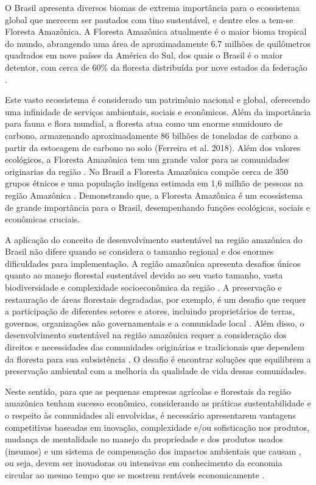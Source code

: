 O Brasil apresenta diversos biomas de extrema importância para o ecossistema global que merecem ser pautados com tino sustentável, e dentre eles a tem-se Floresta Amazônica. A Floresta Amazônica atualmente é o maior bioma tropical do mundo, abrangendo uma área de aproximadamente 6.7 milhões de quilômetros quadrados em nove países da América do Sul, dos quais o Brasil é o maior detentor, com cerca de 60\% da floresta distribuída por nove estados da federação \cite{Malhi2008ClimateAmazon}. 

Este vasto ecossistema é considerado um patrimônio nacional e global, oferecendo uma infinidade de serviços ambientais, sociais e econômicos. Além da importância para fauna e flora mundial, a floresta atua como um enorme sumidouro de carbono, armazenando aproximadamente 86 bilhões de toneladas de carbono a partir da estocagem de carbono no solo (Ferreira et al. 2018). Além dos valores ecológicos, a Floresta Amazônica tem um grande valor para as comunidades originarias da região \cite{Walker2002LandCycles}. No Brasil a Floresta Amazônica compõe cerca de 350 grupos étnicos e uma população indígena estimada em 1,6 milhão de pessoas na região Amazônica \cite{IBGE2010OIndigena}. Demonstrando que, a Floresta Amazônica é um ecossistema de grande importância para o Brasil, desempenhando funções ecológicas, sociais e econômicas cruciais.


A aplicação do conceito de desenvolvimento sustentável na região amazônica do Brasil não difere quando se considera o tamanho regional e dos enormes dificuldades para implementação. A região amazônica apresenta desafios únicos quanto ao manejo florestal sustentável devido ao seu vasto tamanho, vasta biodiversidade e complexidade socioeconômica da região \cite{Cudney-Valenzuela2023TropicalOpenness,Laurance2002OBrasileira}. A preservação e restauração de áreas florestais degradadas, por exemplo, é um desafio que requer a participação de diferentes setores e atores, incluindo proprietários de terras, governos, organizações não governamentais e a comunidade local \cite{Benayas2009EnhancementMeta-Analysis}. Além disso, o desenvolvimento sustentável na região amazônica requer a consideração dos direitos e necessidades das comunidades originárias e tradicionais que dependem da floresta para sua subsistência \cite{Miranda2020SustainableAmazon,Gouvea2014SustainabilityRegion}. O desafio é encontrar soluções que equilibrem a preservação ambiental com a melhoria da qualidade de vida dessas comunidades.


Neste sentido, para que as pequenas empresas agrícolas e florestais da região amazônica tenham sucesso econômico, considerando as práticas sustentabilidade e o respeito às comunidades ali envolvidas, é necessário apresentarem vantagens competitivas baseadas em inovação, complexidade e/ou sofisticação nos produtos, mudança de mentalidade no manejo da propriedade e dos produtos usados (insumos) e um sistema de compensação dos impactos ambientais que causam \cite{ISI:000579859100002}, ou seja, devem ser inovadoras ou intensivas em conhecimento da economia circular ao mesmo tempo que se mostrem rentáveis economicamente \cite{Barraket2016UnderstandingEnterprises}. 

